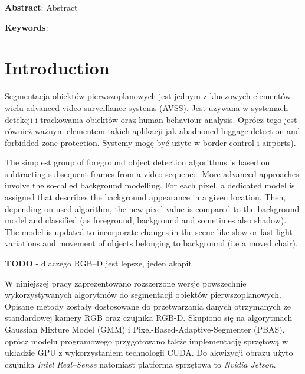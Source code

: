 \documentclass[b5paper,10pt,twoside]{article}
\begin{document}
\noindent
{\small \textbf{Abstract}: Abstract
\vspace{12pt}

\noindent
{\small \textbf{Keywords}: }


\section{Introduction}
\label{sec:introduction}

Segmentacja obiektów pierwszoplanowych jest jednym z kluczowych elementów wielu advanced video surveillance systems (AVSS). Jest używana w systemach detekcji i trackowania obiektów oraz human behaviour analysis. Oprócz tego jest również ważnym elementem takich aplikacji jak abadnoned luggage detection and forbidded zone protection. Systemy mogę być użyte w border control i airports).

The simplest group of foreground object detection algorithms
is based on subtracting subsequent frames from a video
sequence. More advanced approaches involve the so-called
background modelling. For each pixel, a dedicated model is
assigned that describes the background appearance in a given
location. Then, depending on used algorithm, the new pixel
value is compared to the background model and classified
(as foreground, background and sometimes also shadow). The
model is updated to incorporate changes in the scene like slow
or fast light variations and movement of objects belonging to
background (i.e a moved chair).

\textbf{TODO} - dlaczego RGB--D jest lepsze, jeden akapit

W niniejszej pracy zaprezentowano rozszerzone wersje powszechnie wykorzystywanych algorytmów do segmentacji obiektów pierwszoplanowych. Opisane metody zostały dostosowane do przetwarzania danych otrzymanych ze standardowej kamery RGB oraz czujnika RGB-D. Skupiono się na algorytmach Gaussian Mixture Model (GMM) i Pixel-Based-Adaptive-Segmenter (PBAS), oprócz modelu programowego przygotowano także implementację sprzętową w układzie GPU z wykorzystaniem technologii CUDA. 
Do akwizycji obrazu użyto czujnika \textit{Intel Real--Sense} natomiast platforma sprzętowa to \textit{Nvidia Jetson}.

}
\end{document}
